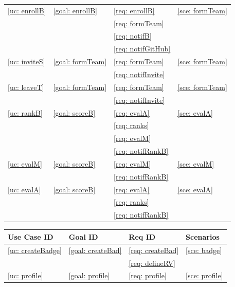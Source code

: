 \begin{table}[h]
\begin{tabular}{|m{3cm}|m{3cm}|m{3cm}|m{3cm}|}
                \hline
                \ref{uc: enrollB} & \ref{goal: enrollB} & \ref{req: enrollB} & \ref{sce: formTeam} \\
                \null & \null  & \ref{req: formTeam}& \null \\ 
                \null & \null  & \ref{req: notifB}&\null \\
                \null & \null  & \ref{req: notifGitHub}&\null \\
                \hline
                \ref{uc: inviteS} & \ref{goal: formTeam} & \ref{req: formTeam} & \ref{sce: formTeam} \\
                \null & \null  & \ref{req: notifInvite}& \null \\ 
                \hline
                \ref{uc: leaveT} & \ref{goal: formTeam} & \ref{req: formTeam} & \ref{sce: formTeam} \\
                \null & \null  & \ref{req: notifInvite}& \null \\ 
                \hline
                \ref{uc: rankB} & \ref{goal: scoreB} & \ref{req: evalA} & \ref{sce: evalA} \\
                \null & \null  & \ref{req: ranks}& \null \\ 
                \null & \null  & \ref{req: evalM}&\null \\
                \null & \null  & \ref{req: notifRankB}&\null \\
                \hline
                \ref{uc: evalM} & \ref{goal: scoreB} & \ref{req: evalM} & \ref{sce: evalM} \\
                \null & \null  & \ref{req: notifRankB}&\null \\
                \hline
                \ref{uc: evalA} & \ref{goal: scoreB} & \ref{req: evalA} & \ref{sce: evalA} \\
                \null & \null  & \ref{req: ranks}&\null \\
                \null & \null  & \ref{req: notifRankB}&\null \\
                \hline
            \end{tabular}
    \end{table}

    \clearpage
    \begin{table}[h]
        \centering
        \renewcommand{\arraystretch}{1.5}
        \begin{tabular}{|m{3cm}|m{3cm}|m{3cm}|m{3cm}|}
            \hline
            \textbf{Use Case ID} & \textbf{Goal ID} & \textbf{Req ID} & \textbf{Scenarios} \\
            \hline
            \ref{uc: createBadge} & \ref{goal: createBad} & \ref{req: createBad} & \ref{sce: badge} \\
            \null & \null  & \ref{req: defineRV}&\null \\
            \hline
            \ref{uc: profile} & \ref{goal: profile} & \ref{req: profile} & \ref{sce: profile} \\
            \hline
        \end{tabular}
    \end{table}
    
